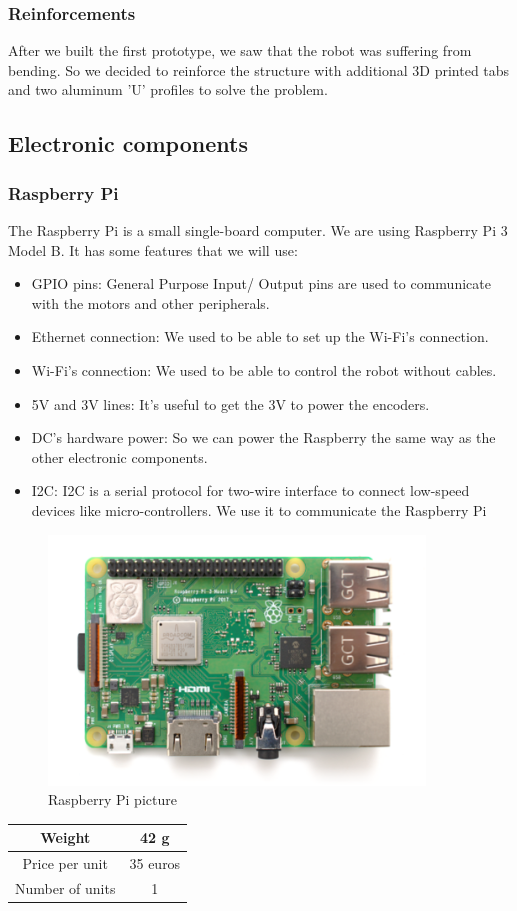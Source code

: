 \subsubsection{Reinforcements}
After we built the first prototype, we saw that the robot was suffering
from bending. So we decided to reinforce the structure with additional 3D
printed tabs and two aluminum 'U' profiles to solve the problem.

\subsection{Electronic components}
\subsubsection{Raspberry Pi}
The Raspberry Pi is a small single-board computer.
We are using Raspberry Pi 3 Model B. It has some features that we will use:
\begin{itemize}
    \item GPIO pins: General Purpose Input/ Output pins are used to
    communicate with the motors and other peripherals.
    \item Ethernet connection: We used to be able to set up the Wi-Fi's connection.
    \item Wi-Fi's connection: We used to be able to control the robot without cables.
    \item 5V and 3V lines: It's useful to get the 3V to power the encoders.
    \item DC's hardware power: So we can power the Raspberry the same way as the
          other electronic components.
    \item I2C: I2C is a serial protocol for two-wire interface to
          connect low-speed devices like micro-controllers. We use it to communicate
          the Raspberry Pi
\end{itemize}
\begin{figure}[H]
    \centering
    \includegraphics[width=10cm]{img/components/raspberry_pi.png}
    \caption{Raspberry Pi picture}
    \label{fig:}
\end{figure}
\begin{center}
    \begin{tabular}{ |c|c| }
        \hline
        Weight          & 42 g     \\
        \hline
        Price per unit  & 35 euros \\
        \hline
        Number of units & 1        \\
        \hline
    \end{tabular}
\end{center}
